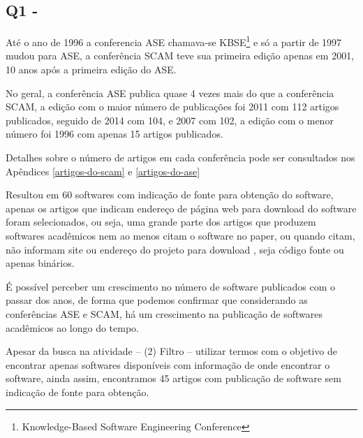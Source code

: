 \subsection{Q1 - \EstudoUmQuestaoUm} %

Até o ano de 1996 a conferencia ASE chamava-se KBSE\footnote{ Knowledge-Based
Software Engineering Conference} e só a partir de 1997 mudou para ASE, a
conferência SCAM teve sua primeira edição apenas em 2001, 10 anos após a
primeira edição do ASE.

No geral, a conferência ASE publica quase 4 vezes mais do que a conferência
SCAM, a edição com o maior número de publicações foi 2011 com 112 artigos
publicados, seguido de 2014 com 104, e 2007 com 102, a edição com o menor
número foi 1996 com apenas 15 artigos publicados.

Detalhes sobre o número de artigos
em cada conferência pode ser consultados nos Apêndices
\ref{artigos-do-scam} e \ref{artigos-do-ase} 



Resultou em 60 softwares com indicação de fonte para obtenção do
software, apenas os artigos que indicam endereço de página web para download do
software foram selecionados, ou seja, uma grande parte dos artigos que produzem
softwares acadêmicos nem ao menos citam o software no paper, ou quando citam,
não informam site ou endereço do projeto para download
\cite{allen2017engineering}, seja código fonte ou apenas binários.


É possível perceber um crescimento no número de software publicados com o
passar dos anos, de forma que podemos confirmar que considerando as
conferências ASE e SCAM, há um crescimento na publicação de softwares
acadêmicos ao longo do tempo.

Apesar da busca na atividade -- (2) Filtro -- utilizar termos com o objetivo de
encontrar apenas softwares disponíveis com informação de onde encontrar o
software, ainda assim, encontramos 45 artigos com publicação de software sem
indicação de fonte para obtenção.

